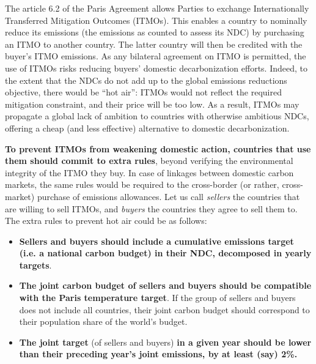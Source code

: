 \documentclass[12pt,english]{article}
\begin{document}
The article 6.2 of the Paris Agreement allows Parties to exchange Internationally Transferred Mitigation Outcomes (ITMOs). This enables a country to nominally reduce its emissions (the emissions as counted to assess its NDC) by purchasing an ITMO to another country. The latter country will then be credited with the buyer's ITMO emissions. As any bilateral agreement on ITMO is permitted, the use of ITMOs risks reducing buyers' domestic decarbonization efforts. %
Indeed, to the extent that the NDCs do not add up to the global emissions reductions objective, there would be ``hot air'': ITMOs would not reflect the required mitigation constraint, and their price will be too low. As a result, ITMOs may propagate a global lack of ambition to countries with otherwise ambitious NDCs, offering a cheap (and less effective) alternative to domestic decarbonization. 

\textbf{To prevent ITMOs from weakening domestic action, countries that use them should commit to extra rules}, beyond verifying the environmental integrity of the ITMO they buy. In case of linkages between domestic carbon markets, the same rules would be required to the cross-border (or rather, cross-market) purchase of emissions allowances. Let us call \textit{sellers} the countries that are willing to sell ITMOs, and \textit{buyers} the countries they agree to sell them to. The extra rules to prevent hot air could be as follows: 
\begin{itemize}
  \item \textbf{Sellers and buyers should include a cumulative emissions target (i.e. a national carbon budget) in their NDC, decomposed in yearly targets}.
  \item \textbf{The joint carbon budget of sellers and buyers should be compatible with the Paris temperature target}. If the group of sellers and buyers does not include all countries, their joint carbon budget should correspond to their population share of the world's budget.
  \item \textbf{The joint target} (of sellers and buyers) \textbf{in a given year should be lower than their preceding year's joint emissions, by at least (say) 2\%.} %
\end{itemize}
\end{document}
